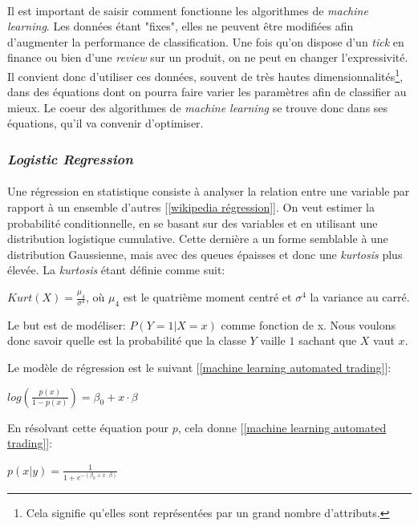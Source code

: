 \documentclass[a4paper, 11pt]{article}
\begin{document}
\paragraph{}
Il est important de saisir comment fonctionne les algorithmes de \textit{machine learning}. Les données étant "fixes", elles ne peuvent être modifiées afin d'augmenter la performance de classification. Une fois qu'on dispose d'un \textit{tick} en finance ou bien d'une \textit{review}  sur un produit, on ne peut en changer l'expressivité. Il convient donc d'utiliser ces données, souvent de très hautes dimensionnalités\footnote{Cela signifie qu'elles sont représentées par un grand nombre d'attributs.}, dans des équations dont on pourra faire varier les paramètres afin de classifier au mieux. Le coeur des algorithmes de \textit{machine learning} se trouve donc dans ses équations, qu'il va convenir d'optimiser.

\subsubsection{\textit{Logistic Regression}} \label{section régression logistique}
\paragraph{}
Une régression en statistique consiste à analyser la relation entre une variable par rapport à un ensemble d'autres [\ref{wikipedia régression}]. On veut estimer la probabilité conditionnelle, en se basant sur des variables et en utilisant une distribution logistique cumulative. Cette dernière a un forme semblable à une distribution Gaussienne, mais avec des queues épaisses et donc une \textit{kurtosis} plus élevée. La \textit{kurtosis} étant définie comme suit:
\begin{center}
$Kurt(X) = \frac{\mu_4}{\sigma^4}$, où $\mu_4$ est le quatrième moment centré et $\sigma^4$ la variance au carré. 
\end{center}
Le but est de modéliser: $P(Y=1 | X=x)$ comme fonction de x. Nous voulons donc savoir quelle est la probabilité que la classe $Y$ vaille $1$ sachant que $X$ vaut $x$.

Le modèle de régression est le suivant [\ref{machine learning automated trading}]:
\begin{center}
$log(\frac{p(x)}{1 - p(x)}) = \beta_0 + x \cdot \beta$
\end{center}

En résolvant cette équation pour $p$, cela donne [\ref{machine learning automated trading}]:
\begin{center}
$p(x|y) = \frac{1}{1 + e^{-(\beta_0 + x \cdot \beta)}}$
\end{center}
\end{document}
